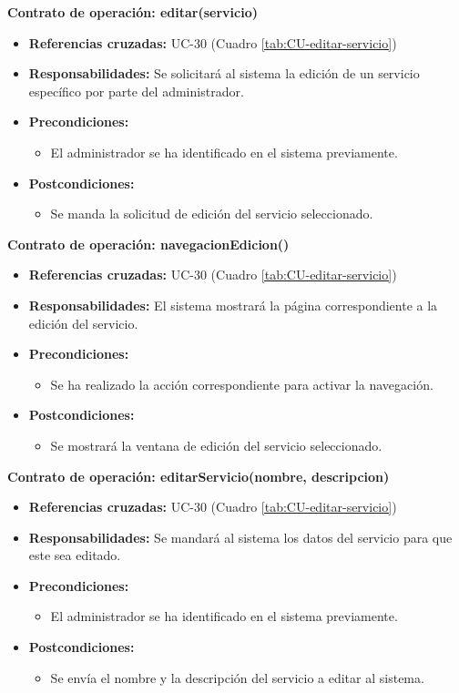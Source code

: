 \textbf{Contrato de operación: editar(servicio)}
\begin{itemize}
\item \textbf{Referencias cruzadas:} UC-30 (Cuadro \ref{tab:CU-editar-servicio})
\item \textbf{Responsabilidades:} Se solicitará al sistema la edición de un servicio específico por parte del administrador.
\item \textbf{Precondiciones:} 
 \begin{itemize}
\item El administrador se ha identificado en el sistema previamente.
\end {itemize}
\item \textbf{Postcondiciones:} 
 \begin{itemize}
\item Se manda la solicitud de edición del servicio seleccionado.
\end {itemize}
\end {itemize}

\textbf{Contrato de operación: navegacionEdicion()}
\begin{itemize}
\item \textbf{Referencias cruzadas:} UC-30 (Cuadro \ref{tab:CU-editar-servicio})
\item \textbf{Responsabilidades:} El sistema mostrará la página correspondiente a la edición del servicio.
\item \textbf{Precondiciones:} 
 \begin{itemize}
\item Se ha realizado la acción correspondiente para activar la navegación.
\end {itemize}
\item \textbf{Postcondiciones:} 
 \begin{itemize}
\item Se mostrará la ventana de edición del servicio seleccionado.
\end {itemize}
\end {itemize}

\textbf{Contrato de operación: editarServicio(nombre, descripcion)}
\begin{itemize}
\item \textbf{Referencias cruzadas:} UC-30 (Cuadro \ref{tab:CU-editar-servicio})
\item \textbf{Responsabilidades:} Se mandará al sistema los datos del servicio para que este sea editado.
\item \textbf{Precondiciones:} 
 \begin{itemize}
\item El administrador se ha identificado en el sistema previamente.
\end {itemize}
\item \textbf{Postcondiciones:} 
 \begin{itemize}
\item Se envía el nombre y la descripción del servicio a editar al sistema.
\end {itemize}
\end {itemize}

